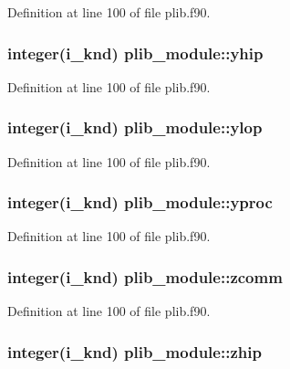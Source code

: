 Definition at line 100 of file plib.\-f90.

\hypertarget{classplib__module_a5520d897cd8da06d1815c1ec27010cf3}{
\subsubsection[{yhip}]{\setlength{\rightskip}{0pt plus 5cm}integer(i\-\_\-knd) plib\-\_\-module\-::yhip}}\label{classplib__module_a5520d897cd8da06d1815c1ec27010cf3}


Definition at line 100 of file plib.\-f90.

\hypertarget{classplib__module_a95589a7523a49a05f8af1b39f7e75df8}{
\subsubsection[{ylop}]{\setlength{\rightskip}{0pt plus 5cm}integer(i\-\_\-knd) plib\-\_\-module\-::ylop}}\label{classplib__module_a95589a7523a49a05f8af1b39f7e75df8}


Definition at line 100 of file plib.\-f90.

\hypertarget{classplib__module_a75e3d1fe13879374c5966909045b4670}{
\subsubsection[{yproc}]{\setlength{\rightskip}{0pt plus 5cm}integer(i\-\_\-knd) plib\-\_\-module\-::yproc}}\label{classplib__module_a75e3d1fe13879374c5966909045b4670}


Definition at line 100 of file plib.\-f90.

\hypertarget{classplib__module_aecf72186ecae9823c0bbe21808acb840}{
\subsubsection[{zcomm}]{\setlength{\rightskip}{0pt plus 5cm}integer(i\-\_\-knd) plib\-\_\-module\-::zcomm}}\label{classplib__module_aecf72186ecae9823c0bbe21808acb840}


Definition at line 100 of file plib.\-f90.

\hypertarget{classplib__module_ac18f767501ee98501fbf13da3185aae7}{
\subsubsection[{zhip}]{\setlength{\rightskip}{0pt plus 5cm}integer(i\-\_\-knd) plib\-\_\-module\-::zhip}}\label{classplib__module_ac18f767501ee98501fbf13da3185aae7}


